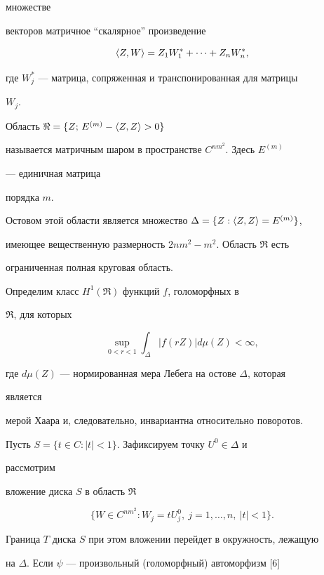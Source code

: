 множестве 


векторов матричное ``скалярное'' произведение 


$$ 


\la Z,W\ra=Z_1W^*_1+\dotsb+Z_n W^*_n, 


$$ 


где $W^*_j$ --- матрица, сопряженная и транспонированная для матрицы 


$W_j$. 


Область $\Re=\{Z;\,E^{(m)}-\langle Z,Z\rangle>0\}$ 


называется матричным шаром в пространстве $C^{nm^2}$. Здесь $E^{(m)}$ 


--- единичная матрица 


порядка $m$. 


Остовом этой области является множество $\Delta=\{Z:\la 


Z,Z\ra=E^{(m)}\}$, 


имеющее вещественную размерность $2nm^2-m^2$. Область $\Re$ есть 


ограниченная полная круговая область. 


 


Определим класс $H^1(\Re)$ функций $f$, голоморфных в 


$\Re$, для которых 


$$ 


\sup_{0<r<1}\int_\Delta|f(r Z)|d\mu(Z)<\infty, 


$$ 


где $d\mu(Z)$ --- нормированная мера Лебега на остове $\Delta$, которая 


является 


мерой Хаара и, следовательно, инвариантна относительно поворотов. 


 


Пусть $S=\{t\in C:|t|<1\}$. Зафиксируем точку $U^0\in\Delta$ и 


рассмотрим 


вложение диска $S$ в область $\Re$ 


\begin{equation} 


\{W\in C^{nm^2}:W_j=t U^0_j,\ j=1,\dotsc,n,\ |t|<1\}. 


\end{equation} 


Граница $T$ диска $S$ при этом вложении перейдет в окружность, лежащую 


на $\Delta$. Если $\psi$ --- произвольный (голоморфный) автоморфизм [6] 


